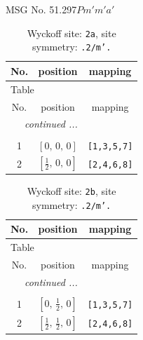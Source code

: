 \documentclass[fleqn,8pt]{jsarticle}
\begin{document}
\setcounter{MaxMatrixCols}{32}

\renewcommand{\tablename}{Table~}
\renewcommand{\figurename}{Figure~}
\begin{center}
\LARGE
MSG No. 51.297\quad$Pm'm'a'$
\end{center}
\renewcommand{\arraystretch}{1.2}
\begin{longtable}{ccc}
\caption{Wyckoff site: {\tt 2a}, site symmetry: {\tt .2/m'.}}
 \\
 \hline \hline
No. & position & mapping \\ \hline \endfirsthead

\multicolumn{2}{l}{\tablename\ \thetable{}} \\
 \hline \hline
No. & position & mapping \\ \hline \endhead

 \hline \hline
\multicolumn{2}{r}{\footnotesize\it continued ...} \\ \endfoot

 \hline \hline
\multicolumn{2}{r}{} \\ \endlastfoot

1 & $\left[ 0,\, 0,\, 0 \right]$ & {\tt [1,3,5,7]} \\ \hline
2 & $\left[ \frac{1}{2},\, 0,\, 0 \right]$ & {\tt [2,4,6,8]} \\
\end{longtable}
\renewcommand{\arraystretch}{1.2}
\begin{longtable}{ccc}
\caption{Wyckoff site: {\tt 2b}, site symmetry: {\tt .2/m'.}}
 \\
 \hline \hline
No. & position & mapping \\ \hline \endfirsthead

\multicolumn{2}{l}{\tablename\ \thetable{}} \\
 \hline \hline
No. & position & mapping \\ \hline \endhead

 \hline \hline
\multicolumn{2}{r}{\footnotesize\it continued ...} \\ \endfoot

 \hline \hline
\multicolumn{2}{r}{} \\ \endlastfoot

1 & $\left[ 0,\, \frac{1}{2},\, 0 \right]$ & {\tt [1,3,5,7]} \\ \hline
2 & $\left[ \frac{1}{2},\, \frac{1}{2},\, 0 \right]$ & {\tt [2,4,6,8]} \\
\end{longtable}
\renewcommand{\arraystretch}{1.2}
\end{document}
